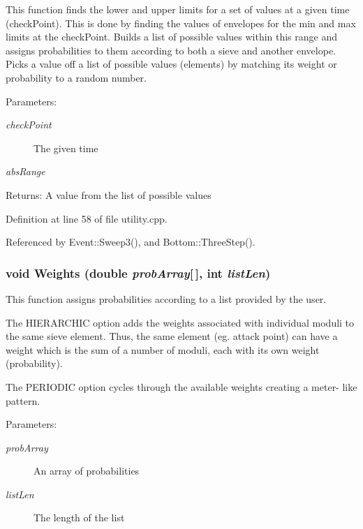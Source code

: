 This function finds the lower and upper limits for a set of values at a given time (check\-Point). This is done by finding the values of envelopes for the min and max limits at the check\-Point. Builds a list of possible values within this range and assigns probabilities to them according to both a sieve and another envelope. Picks a value off a list of possible values (elements) by matching its weight or probability to a random number. \begin{Desc}
\item[Parameters:]
\begin{description}
\item[{\em check\-Point}]The given time \item[{\em abs\-Range}]\end{description}
\end{Desc}
\begin{Desc}
\item[Returns:]A value from the list of possible values \end{Desc}


Definition at line 58 of file utility.cpp.

Referenced by Event::Sweep3(), and Bottom::Three\-Step().
\subsubsection{\setlength{\rightskip}{0pt plus 5cm}void Weights (double {\em prob\-Array}[$\,$], int {\em list\-Len})}\label{utility_8h_a43}


This function assigns probabilities according to a list provided by the user.

The HIERARCHIC option adds the weights associated with individual moduli to the same sieve element. Thus, the same element (eg. attack point) can have a weight which is the sum of a number of moduli, each with its own weight (probability).

The PERIODIC option cycles through the available weights creating a meter- like pattern. \begin{Desc}
\item[Parameters:]
\begin{description}
\item[{\em prob\-Array}]An array of probabilities \item[{\em list\-Len}]The length of the list \end{description}
\end{Desc}


